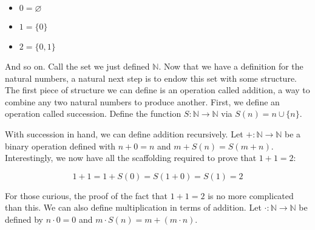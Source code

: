 \documentclass[12pt]{article}
\begin{document}
\begin{itemize}[noitemsep]
  \item \(0 = \varnothing\)
  \item \(1 = \{0\}\)
  \item \(2 = \{0, 1\}\)
\end{itemize}

And so on. Call the set we just defined \(\mathbb{N}\). Now that we have a
definition for the natural numbers, a natural next step is to endow this set
with some structure. The first piece of structure we can define is an operation
called addition, a way to combine any two natural numbers to produce another.
First, we define an operation called succession. Define the function \(S :
\mathbb{N} \to \mathbb{N}\) via \(S(n) = n \cup \{n\}\).

With succession in hand, we can define addition recursively. Let \(+ :
\mathbb{N} \to \mathbb{N}\) be a binary operation defined with \(n + 0 = n\)
and \(m + S(n) = S(m + n)\). Interestingly, we now have all the scaffolding
required to prove that \(1 + 1 = 2\):

\begin{equation*}
  1 + 1 = 1 + S(0) = S(1 + 0) = S(1) = 2
\end{equation*}

For those curious, the proof of the fact that \(1 + 1 = 2\) is no more
complicated than this. We can also define multiplication in terms of addition.
Let \(\cdot : \mathbb{N} \to \mathbb{N}\) be defined by \(n \cdot 0 = 0\) and
\(m \cdot S(n) = m + (m \cdot n)\).
\end{document}
